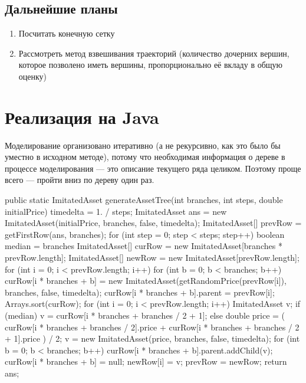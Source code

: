 \documentclass[specialist,
               substylefile = spbu.rtx,
               subf,href,colorlinks=true, 12pt]{disser}
\begin{document}
\section*{Дальнейшие планы}
	\begin{enumerate}
		\item Посчитать конечную сетку
		\item Рассмотреть метод взвешивания траекторий (количество дочерних вершин, которое позволено иметь вершины, пропорционально её вкладу в общую оценку)
	\end{enumerate}
\nocite{*}



\appendix
\chapter{Реализация на Java}
Моделирование организовано итеративно (а не рекурсивно, как это было бы уместно в исходном методе), потому что необходимая информация о дереве в процессе моделирования --- это описание текущего ряда целиком. Поэтому проще всего --- пройти вниз по дереву один раз.
\begin{listing}[caption={Генерирование дерева состояний актива, на который выписан опцион},label={lst:treeGeneration}]
public static ImitatedAsset generateAssetTree(int branches, int steps, double initialPrice){
        timedelta = 1. / steps;
        ImitatedAsset ans = new ImitatedAsset(initialPrice, branches, false, timedelta);
        ImitatedAsset[] prevRow = getFirstRow(ans, branches);
        for (int step = 0; step < steps; step++) {
            boolean median = branches %
            ImitatedAsset[] curRow = new ImitatedAsset[branches * prevRow.length];
            ImitatedAsset[] newRow = new ImitatedAsset[prevRow.length];
            for (int i = 0; i < prevRow.length; i++) {
                for (int b = 0; b < branches; b++) {
                    curRow[i * branches + b] = new ImitatedAsset(getRandomPrice(prevRow[i]), branches, false, timedelta);
                    curRow[i * branches + b].parent = prevRow[i];}}
            Arrays.sort(curRow);
            for (int i = 0; i < prevRow.length; i++) {
                ImitatedAsset v;
                if (median) {
                    v = curRow[i * branches + branches / 2 + 1];
                } else {
                    double price = (
                            curRow[i * branches + branches / 2].price + curRow[i * branches + branches / 2 + 1].price
                    ) / 2;
                    v = new ImitatedAsset(price, branches, false, timedelta);}
                for (int b = 0; b < branches; b++) {
                    curRow[i * branches + b].parent.addChild(v);
                    curRow[i * branches + b] = null;}
                newRow[i] = v;}
            prevRow = newRow;}
        return ans;}
\end{listing}
\end{document}
